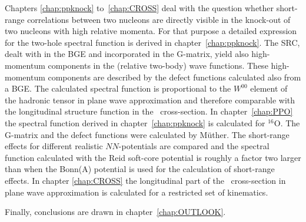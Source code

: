 Chapters \ref{chap:ppknock} to~\ref{chap:CROSS} deal with the question whether 
short-range correlations between two nucleons are directly visible in the 
knock-out of two nucleons with high relative momenta. 
For that purpose a detailed expression for the two-hole spectral function is 
derived in chapter~\ref{chap:ppknock}. The SRC, dealt with in the BGE and 
incorporated in the G-matrix, yield also high-momentum components in the 
(relative two-body) wave functions. These high-momentum components are 
described by the defect functions calculated also from a BGE. The calculated 
spectral function is proportional to the $W^{00}$ element of the hadronic 
tensor in plane wave approximation and therefore comparable with the 
longitudinal structure function in the \eepp\ cross-section.
In chapter~\ref{chap:PPO} the spectral function derived in 
chapter~\ref{chap:ppknock} is calculated for $^{16}$O. 
The G-matrix and the defect functions were calculated by M\"uther.
The short-range effects for different realistic $NN$-potentials are compared
and the spectral function calculated with the Reid soft-core potential is 
roughly a factor two larger than when the Bonn(A) potential is used for the
calculation of short-range effects. In chapter \ref{chap:CROSS} the 
longitudinal part of the \eepp\ cross-section in plane wave approximation is 
calculated for a restricted set  of kinematics. 


Finally, conclusions are drawn in chapter~\ref{chap:OUTLOOK}.
